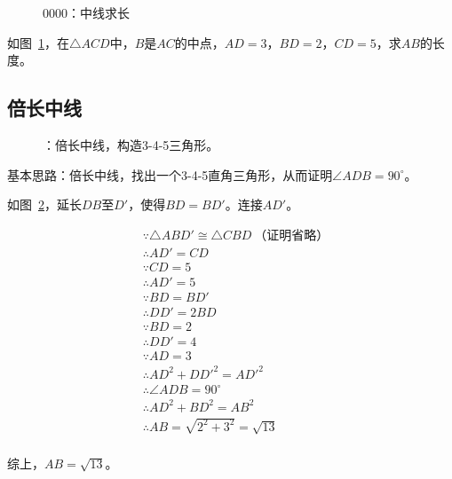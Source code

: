 

\begin{figure}[htbp]
  \centering
  \caption{0000：中线求长} \label{fig:0000}
\end{figure}

如图~\ref{fig:0000}，在$\triangle ACD$中，$B$是$AC$的中点，$AD = 3$，$BD = 2$，$CD = 5$，求$AB$的长度。


\subsection{倍长中线} \label{subsec:0000-mid}

\begin{figure}[htbp]
  \centering
  \caption{：倍长中线，构造3-4-5三角形。} \label{fig:0000-mid}
\end{figure}

基本思路：倍长中线，找出一个3-4-5直角三角形，从而证明$\angle ADB = 90^\circ$。

如图~\ref{fig:0000-mid}，延长$DB$至$D'$，使得$BD = BD'$。连接$AD'$。

\begin{align*}
  &\because   \triangle ABD' \cong \triangle CBD \ \text{（证明省略）} \\
  &\therefore AD' = CD \\
  &\because   CD = 5 \\
  &\therefore AD' = 5 \\
  &\because   BD = BD' \\
  &\therefore DD' = 2BD \\
  &\because   BD = 2 \\
  &\therefore DD' = 4 \\
  &\because   AD = 3 \\
  &\therefore AD^2 + DD'^2 = AD'^2 \\
  &\therefore \angle ADB = 90^\circ \\
  &\therefore AD^2 + BD^2 = AB^2 \\
  &\therefore AB = \sqrt{2^2 + 3^2} = \sqrt{13} \\
\end{align*}

综上，$AB = \sqrt{13}$。
